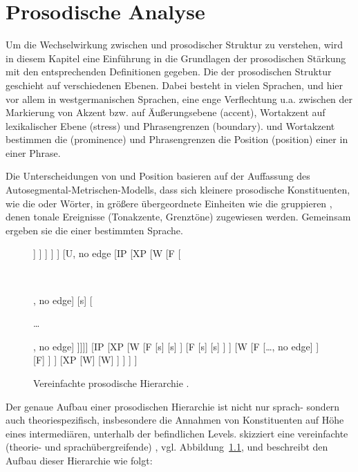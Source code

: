 \chapter{Prosodische Analyse}
\label{chap:05}

Um die Wechselwirkung zwischen  und prosodischer Struktur zu verstehen, wird in diesem Kapitel eine Einführung in die Grundlagen der prosodischen Stärkung mit den entsprechenden Definitionen gegeben. Die  der prosodischen Struktur geschieht auf verschiedenen Ebenen. Dabei besteht in vielen Sprachen, und hier vor allem in westgermanischen Sprachen, eine enge Verflechtung u.a. zwischen der Markierung von Akzent bzw.  auf Äußerungsebene (accent), Wortakzent auf lexikalischer Ebene (stress) und Phrasengrenzen (boundary).  und Wortakzent bestimmen die  (prominence) und Phrasengrenzen die Position (position) einer  in einer Phrase.

Die Unterscheidungen von  und Position basieren auf der Auffassung des Autosegmental-Metrischen-Modells, dass sich kleinere prosodische Konstituenten, wie die  oder Wörter, in größere übergeordnete Einheiten wie die  gruppieren \citep[vgl. Übersicht in][]{Shattuck1996, Beckman1996, Gussenhoven2004, Keating2004}, denen tonale Ereignisse (Tonakzente, Grenztöne) zugewiesen werden. Gemeinsam ergeben sie die  einer bestimmten Sprache.


\begin{figure}[b]
	\caption{Vereinfachte prosodische Hierarchie \citep[nach][779]{Grice2006}.}
	\label{figure:0501}
\small
\begin{forest}
[
[Äußerung, no edge
  [Intonationsphrase, no edge
    [Kleine Phrase, no edge
      [Phonologisches Wort, no edge
	[Fuß, no edge 
	  [Silbe, no edge]
	]
      ]
    ]
  ]
]
[U, no edge
  [IP [XP [W [F 
	  [{\parbox[t]{2mm}{~}}, no edge]
	  [s]
	  [{\parbox[t]{2mm}{{\dots}}}, no edge]
  ]]]]
  [IP
    [XP
      [W
	[F
	  [s]
	  [s]
	]
	[F
	  [s]
	  [s]
	]
      ] 
      [W
	[F 
	  [{\dots}, no edge]	
	]
	[F]
      ]
    ]    
    [XP
      [W] 
      [W]
    ]
  ] 
]
]  
\end{forest}

	
\end{figure}

Der genaue Aufbau einer prosodischen Hierarchie ist nicht nur sprach- sondern auch theoriespezifisch, insbesondere die Annahmen von Konstituenten auf Höhe eines intermediären, unterhalb der  befindlichen Levels. \citet{Grice2006} skizziert eine vereinfachte (theorie- und sprachübergreifende) , vgl. Abbildung~\ref{figure:0501}, und beschreibt den Aufbau dieser Hierarchie wie folgt:

